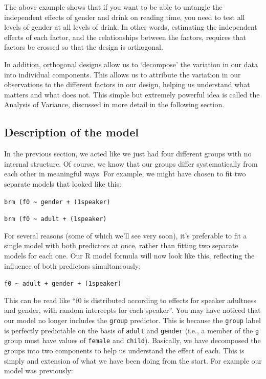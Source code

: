 \documentclass[
]{book}
\begin{document}
The above example shows that if you want to be able to untangle the independent effects of gender and drink on reading time, you need to test all levels of gender at all levels of drink. In other words, estimating the independent effects of each factor, and the relationships between the factors, requires that factors be crossed so that the design is orthogonal.

In addition, orthogonal designs allow us to `decompose' the variation in our data into individual components.
This allows us to attribute the variation in our observations to the different factors in our design, helping us understand what matters and what does not. This simple but extremely powerful idea is called the Analysis of Variance, discussed in more detail in the following section.

\hypertarget{description-of-the-model-3}{%
\subsection{Description of the model}\label{description-of-the-model-3}}

In the previous section, we acted like we just had four different groups with no internal structure. Of course, we know that our groups differ systematically from each other in meaningful ways. For example, we might have chosen to fit two separate models that looked like this:

\texttt{brm\ (f0\ \textasciitilde{}\ gender\ +\ (1\textbar{}speaker)}

\texttt{brm\ (f0\ \textasciitilde{}\ adult\ +\ (1\textbar{}speaker)}

For several reasons (some of which we'll see very soon), it's preferable to fit a single model with both predictors at once, rather than fitting two separate models for each one. Our R model formula will now look like this, reflecting the influence of both predictors simultaneously:

\texttt{f0\ \textasciitilde{}\ adult\ +\ gender\ +\ (1\textbar{}speaker)}

This can be read like ``f0 is distributed according to effects for speaker adultness and gender, with random intercepts for each speaker''. You may have noticed that our model no longer includes the \texttt{group} predictor. This is because the \texttt{group} label is perfectly predictable on the basis of \texttt{adult} and \texttt{gender} (i.e., a member of the \texttt{g} group must have values of \texttt{female} and \texttt{child}). Basically, we have decomposed the groups into two components to help us understand the effect of each. This is simply and extension of what we have been doing from the start. For example our model was previously:
\end{document}
